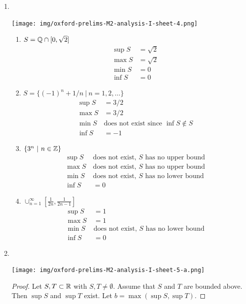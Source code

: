 \begin{enumerate}
\item~\\
  \begin{mdframed}
    \texttt{[image: img/oxford-prelims-M2-analysis-I-sheet-4.png]}
  \end{mdframed}
  \begin{enumerate}
  \item $S = \mathbb{Q} \cap [0, \sqrt 2]$
    \begin{align*}
      \sup S &= \sqrt 2\\
      \max S &= \sqrt 2\\
      \min S &= 0\\
      \inf S &= 0
    \end{align*}
  \item $S = \{(-1)^n + 1/n ~|~ n=1,2,\ldots\}$
    \begin{align*}
      \sup S &= 3/2\\
      \max S &= 3/2\\
      \min S ~&\text{does not exist since $\inf S \not\in S$}\\
      \inf S &= -1
    \end{align*}
  \item $\{3^n ~|~ n \in \mathbb{Z}\}$
    \begin{align*}
      \sup S ~&\text{does not exist, $S$ has no upper bound}\\
      \max S ~&\text{does not exist, $S$ has no upper bound}\\
      \min S ~&\text{does not exist, $S$ has no lower bound}\\
      \inf S &= 0
    \end{align*}
  \item $\cup_{n=1}^\infty [\frac{1}{2n}, \frac{1}{2n - 1}]$
    \begin{align*}
      \sup S ~&= 1\\
      \max S ~&= 1\\
      \min S ~&\text{does not exist, $S$ has no lower bound}\\
      \inf S ~&=0
    \end{align*}
  \end{enumerate}

\item~\\
  \begin{mdframed}
    \texttt{[image: img/oxford-prelims-M2-analysis-I-sheet-5-a.png]}
  \end{mdframed}

  \begin{proof}
    Let $S, T \subset \mathbb{R}$ with $S, T \neq \emptyset$. Assume that $S$ and $T$ are bounded
    above. Then $\sup S$ and $\sup T$ exist. Let $b = \max(\sup S, \sup T)$.


\end{proof}
\end{enumerate}
